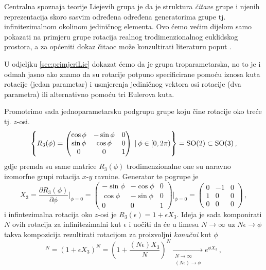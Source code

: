 Centralna spoznaja teorije Liejevih grupa je da je struktura \emph{čitave} grupe i
njenih reprezentacija skoro sasvim određena
određena generatorima grupe tj. infinitezimalnom okolinom jediničnog 
elementa.
Ovo ćemo većim dijelom samo pokazati na primjeru grupe rotacija realnog
trodimenzionalnog euklidskog prostora, a za općeniti
dokaz čitaoc može konzultirati literaturu poput \cite{Stilwell:2008}.


U odjeljku \ref{sec:primjeriLie} dokazat ćemo da je grupa  troparametarska,
no to je i odmah jasno ako znamo da su rotacije potpuno specificirane pomoću
iznosa kuta rotacije (jedan parametar) i usmjerenja jediničnog vektora osi rotacije (dva parametra)
ili alternativno pomoću tri Eulerova kuta.

Promotrimo sada jednoparametarsku podgrupu grupe  koju čine
rotacije oko treće tj. $z$-osi.
\begin{displaymath}
\left\{ R_3 (\phi) = 
\begin{pmatrix}
\cos\phi & -\sin\phi & 0 \\
\sin\phi & \cos\phi & 0 \\
0 & 0 & 1 
\end{pmatrix}
 \: | \: \phi \in [0, 2\pi) \right\} = \mathrm{SO}(2) \subset \mathrm{SO}(3) \,,
\end{displaymath}
gdje premda su same matrice $R_3 (\phi)$ trodimenzionalne one su
naravno izomorfne grupi  rotacija $x$-$y$ ravnine.
Generator te pogrupe je
\begin{equation} \label{eq:x3so3}
X_3 = \frac{\partial R_3 (\phi)}{\partial \phi}\Bigg|_{\phi=0}=
\begin{pmatrix}
-\sin\phi & -\cos\phi & 0 \\
\cos\phi & -\sin\phi & 0 \\
0 & 0 & 1 
\end{pmatrix}\Bigg|_{\phi=0} =
\begin{pmatrix}
0 & -1 & 0 \\
1 & 0 & 0 \\
0 & 0 & 0 
\end{pmatrix} \,,
\end{equation}
i infintezimalna rotacija oko $z$-osi je $R_3 (\epsilon) = 1 + \epsilon X_3$.
Ideja je sada komponirati $N$ ovih rotacija za infinitezimalni kut
$\epsilon$ i uočiti da
će u limesu $N \to\infty$ uz $N\epsilon \to \phi$ 
takva kompozicija rezultirati rotacijom za proizvoljni \emph{konačni}
kut $\phi$
\begin{displaymath}
[R_3(\epsilon)]^{N} = (1+\epsilon X_3)^N = \left(1+\frac{(N\epsilon)X_3}
 {N}\right)^N 
 \xrightarrow[\substack{N \to \infty \\ (N\epsilon) \to \phi}]{}
 e^{\phi X_3} \,,
\end{displaymath}
